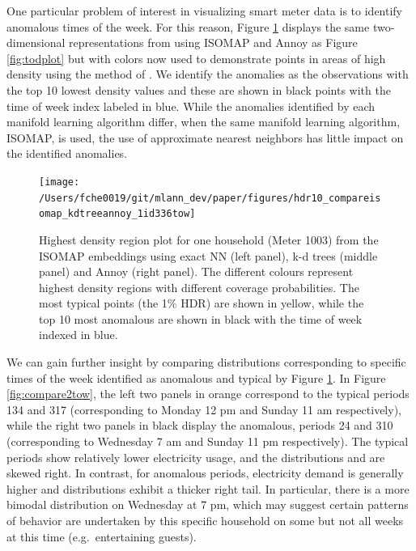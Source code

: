 \documentclass[11pt,a4paper,]{article}
\begin{document}
One particular problem of interest in visualizing smart meter data is to identify anomalous times of the week. For this reason, Figure \ref{fig:anomalies1id} displays the same two-dimensional representations from using ISOMAP and Annoy as Figure \ref{fig:todplot} but with colors now used to demonstrate points in areas of high density using the method of \textcite{Hyndman1996-lk}. We identify the anomalies as the observations with the top 10 lowest density values and these are shown in black points with the time of week index labeled in blue. While the anomalies identified by each manifold learning algorithm differ, when the same manifold learning algorithm, ISOMAP, is used, the use of approximate nearest neighbors has little impact on the identified anomalies.

\begin{figure}

{\centering \texttt{[image: /Users/fche0019/git/mlann\_dev/paper/figures/hdr10\_compareisomap\_kdtreeannoy\_1id336tow]} 

}

\caption{Highest density region plot for one household (Meter 1003) from the ISOMAP embeddings using exact NN (left panel), k-d trees (middle panel) and Annoy (right panel). The different colours represent highest density regions with different coverage probabilities. The most typical points (the 1\% HDR) are shown in yellow, while the top 10 most anomalous are shown in black with the time of week indexed in blue.}\label{fig:anomalies1id}
\end{figure}

We can gain further insight by comparing distributions corresponding to specific times of the week identified as anomalous and typical by Figure \ref{fig:anomalies1id}. In Figure \ref{fig:compare2tow}, the left two panels in orange correspond to the typical periods 134 and 317 (corresponding to Monday 12 pm and Sunday 11 am respectively), while the right two panels in black display the anomalous, periods 24 and 310 (corresponding to Wednesday 7 am and Sunday 11 pm respectively). The typical periods show relatively lower electricity usage, and the distributions and are skewed right. In contrast, for anomalous periods, electricity demand is generally higher and distributions exhibit a thicker right tail. In particular, there is a more bimodal distribution on Wednesday at 7 pm, which may suggest certain patterns of behavior are undertaken by this specific household on some but not all weeks at this time (e.g.~entertaining guests).
\end{document}
